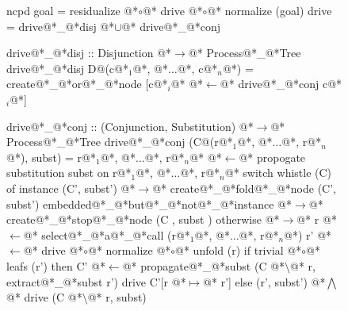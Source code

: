\documentclass[12pt,a4paper]{report}
\begin{document}
\thispagestyle{empty}
\begin{figure}[h]
\begin{PseudoCode}[moredelim={[is][stringstyle]{@@}{@@}},
  moredelim={[is][\color{dkgreen}\bfseries]{@!}{@!}},
  moredelim={[is][\color{red}\bfseries]{!!}{!!}}]
ncpd goal = residualize @*$\circ$@* drive @*$\circ$@* normalize (goal)
drive     = drive@*\_@*disj @*$\cup$@* drive@*\_@*conj

drive@*\_@*disj :: Disjunction @*$\to$@* Process@*\_@*Tree
drive@*\_@*disj D@(c@*$_1$@*, @*$\dots$@*, c@*$_n$@*) =
  create@*\_@*or@*\_@*node [c@*$_i$@* @*$\leftarrow$@* drive@*\_@*conj c@*$_i$@*]

drive@*\_@*conj :: (Conjunction, Substitution) @*$\to$@* Process@*\_@*Tree
drive@*\_@*conj (C@(r@*$_1$@*, @*$\dots$@*, r@*$_n$@*), subst) =
  r@*$_1$@*, @*$\dots$@*, r@*$_n$@* @*$\leftarrow$@* propogate substitution subst on r@*$_1$@*, @*$\dots$@*, r@*$_n$@*
  switch whistle (C) of
    instance (C', subst')      @*$\to$@* create@*\_@*fold@*\_@*node (C', subst')
    embedded@*\_@*but@*\_@*not@*\_@*instance @*$\to$@* create@*\_@*stop@*\_@*node (C , subst )
    otherwise @*$\to$@*
      r  @*$\leftarrow$@* select@*\_@*a@*\_@*call (r@*$_1$@*, @*$\dots$@*, r@*$_n$@*)
      r' @*$\leftarrow$@* drive @*$\circ$@* normalize @*$\circ$@* unfold (r)
      if trivial @*$\circ$@* leafs (r')
      then
        C' @*$\leftarrow$@* propagate@*\_@*subst (C @*$\setminus$@* r, extract@*\_@*subst r')
        drive C'[r @*$\mapsto$@* r']
      else
        (r', subst') @*$\bigwedge$@* drive (C @*$\setminus$@* r, subst)
\end{PseudoCode}
\end{figure}
\end{document}
